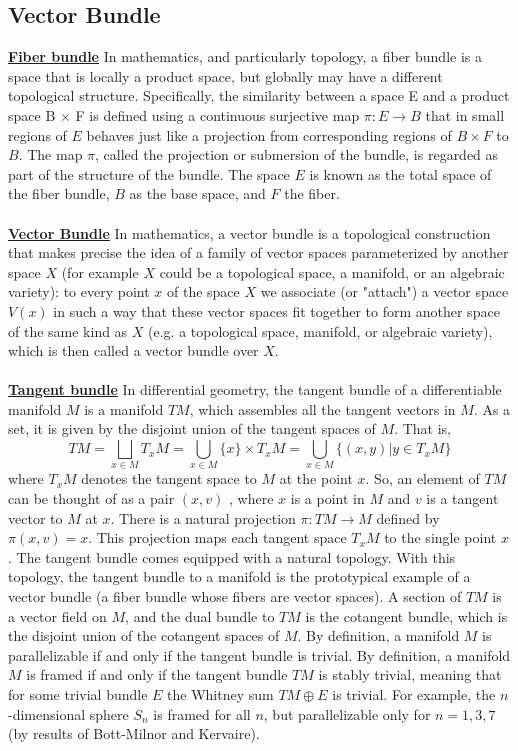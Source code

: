 \documentclass{article}
\begin{document}
\subsection{Vector Bundle}
\href{https://en.wikipedia.org/wiki/Fiber_bundle}{\textbf{Fiber bundle}} 
In mathematics, and particularly topology, a fiber bundle is a space that is locally a product space, but globally may have a different topological structure. Specifically, the similarity between a space E and a product space B × F is defined using a continuous surjective map $\pi :E \to B$ that in small regions of $E$ behaves just like a projection from corresponding regions of $B \times F$ to $B$. The map $\pi$, called the projection or submersion of the bundle, is regarded as part of the structure of the bundle. The space $E$ is known as the total space of the fiber bundle, $B$ as the base space, and $F$ the fiber.\\ \\
\href{https://en.wikipedia.org/wiki/Vector_bundle}{\textbf{Vector Bundle}} 
In mathematics, a vector bundle is a topological construction that makes precise the idea of a family of vector spaces parameterized by another space $X$ (for example $X$ could be a topological space, a manifold, or an algebraic variety): to every point $x$ of the space $X$ we associate (or "attach") a vector space $V(x)$ in such a way that these vector spaces fit together to form another space of the same kind as $X$ (e.g. a topological space, manifold, or algebraic variety), which is then called a vector bundle over $X$.\\ \\
\href{https://en.wikipedia.org/wiki/Tangent_bundle}{\textbf{Tangent bundle}} 
In differential geometry, the tangent bundle of a differentiable manifold $M$ is a manifold $TM$, which assembles all the tangent vectors in $M$. As a set, it is given by the disjoint union of the tangent spaces of $M$. That is,
\[
TM = \bigsqcup_{x \in M}T_xM = \bigcup_{x \in M} \{x\} \times T_xM = \bigcup_{x \in M}\{(x,y)| y \in T_xM \}
\]
where $T_xM$ denotes the tangent space to $M$ at the point $x$. So, an element of $TM$ can be thought of as a pair $(x,v)$ , where $x$ is a point in $M$ and $v$ is a tangent vector to $M$ at $x$. There is a natural projection $\pi : TM \to M$ defined by $\pi(x,v) = x$. This projection maps each tangent space $T_xM$ to the single point $x$.
The tangent bundle comes equipped with a natural topology. With this topology, the tangent bundle to a manifold is the prototypical example of a vector bundle (a fiber bundle whose fibers are vector spaces). A section of $TM$ is a vector field on $M$, and the dual bundle to $TM$ is the cotangent bundle, which is the disjoint union of the cotangent spaces of $M$. By definition, a manifold $M$ is parallelizable if and only if the tangent bundle is trivial. By definition, a manifold $M$ is framed if and only if the tangent bundle $TM$ is stably trivial, meaning that for some trivial bundle $E$ the Whitney sum $TM \oplus E$ is trivial. For example, the $n$-dimensional sphere $S_n$ is framed for all $n$, but parallelizable only for $n=1,3,7$ (by results of Bott-Milnor and Kervaire).\\
\end{document}
